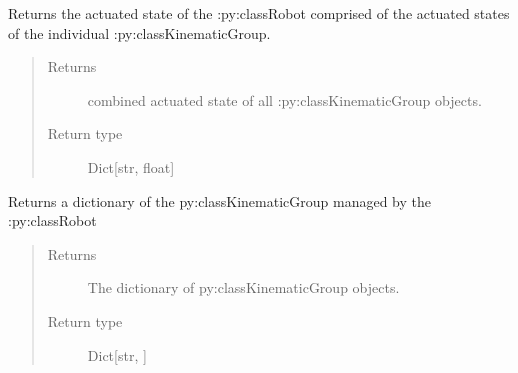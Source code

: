 \documentclass[letterpaper,10pt,english]{sphinxmanual}
\begin{document}
\begin{fulllineitems}
\begin{fulllineitems}
\label{\detokenize{code_docu:trip_kinematics.Robot.Robot.get_actuated_state}}
Returns the actuated state of the :py:class\textasciigrave{}Robot\textasciigrave{} comprised of the actuated states of the individual :py:class\textasciigrave{}KinematicGroup\textasciigrave{}.
\begin{quote}\begin{description}
\item[{Returns}] \leavevmode
combined actuated state of all :py:class\textasciigrave{}KinematicGroup\textasciigrave{} objects.

\item[{Return type}] \leavevmode
Dict{[}str, float{]}

\end{description}\end{quote}

\end{fulllineitems}


\begin{fulllineitems}
\label{\detokenize{code_docu:trip_kinematics.Robot.Robot.get_groups}}
Returns a dictionary of the py:class\textasciigrave{}KinematicGroup\textasciigrave{} managed by the :py:class\textasciigrave{}Robot\textasciigrave{}\sphinxhyphen{}
\begin{quote}\begin{description}
\item[{Returns}] \leavevmode
The dictionary of py:class\textasciigrave{}KinematicGroup\textasciigrave{} objects.

\item[{Return type}] \leavevmode
Dict{[}str, {\hyperref[\detokenize{code_docu:trip_kinematics.KinematicGroup.KinematicGroup}]{}}{]}

\end{description}\end{quote}

\end{fulllineitems}



\end{fulllineitems}
\end{document}
